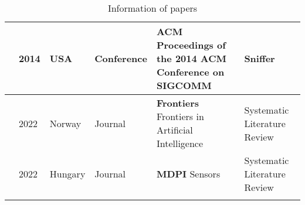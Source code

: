\begin{footnotesize}
\begin{longtable}{p{1.2cm} p{1cm} p{1.5cm} p{3.2cm} p{5cm} p{3cm}}
        \hline
        \cite{KumarLTE} & 2014 & USA & Conference & \textbf{ACM} Proceedings of the 2014 ACM Conference on SIGCOMM & Sniffer \\
        \hline
        \cite{yang2022overview} & 2022 & Norway & Journal & \textbf{Frontiers} Frontiers in Artificial Intelligence & Systematic Literature Review \\
        \hline
        \cite{zubaydi2023leveraging} & 2022 & Hungary & Journal & \textbf{MDPI} Sensors & Systematic Literature Review \\
        \hline
        \caption{Information of papers}
        \label{table:literature_overview}
    \end{longtable}
\end{footnotesize}

